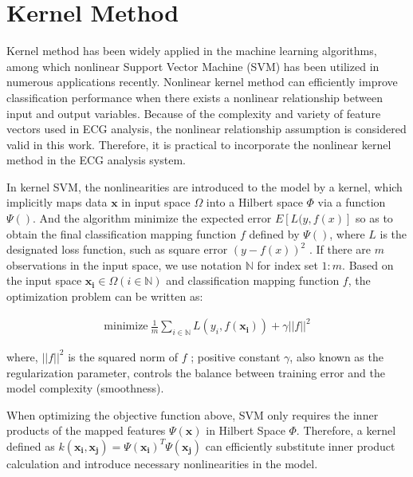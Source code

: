 \section{Kernel Method}

Kernel method has been widely applied in the machine learning algorithms, among which nonlinear Support Vector Machine (SVM) has been utilized in numerous applications recently\cite{shawe2004kernel}. Nonlinear kernel method can efficiently improve classification performance when there exists a nonlinear relationship between input and output variables. Because of the complexity and variety of feature vectors used in ECG analysis, the nonlinear relationship assumption is considered valid in this work. Therefore, it is practical to incorporate the nonlinear kernel method in the ECG analysis system.

In kernel SVM, the nonlinearities are introduced to the model by a kernel, which implicitly maps data $\mathbf{x}$ in input space $\Omega$ into a Hilbert space $\Phi$ via a function $\Psi()$\cite{aronszajn1950theory}. And the algorithm  minimize the expected error $E[L(y,f(x)]$ so as to obtain the final classification mapping function $f$ defined by $\Psi()$, where $L$ is the designated loss function, such as square error $(y-f(x))^2$ \cite{scholkopf1999advances}. If there are $m$ observations in the input space, we use notation $\mathbb{N}$ for index set ${1:m}$. Based on the input space $\mathbf{x_i}\in \Omega (i\in \mathbb{N})$ and classification mapping function $f$, the optimization problem can be written as:

\begin{align}
    \text{minimize}~\frac{1}{m}\sum_{i\in \mathbb{N}}L(y_i,f(\mathbf{x_i})) + \gamma||f||^2
    \label{eq:kernel}
\end{align}

where, $||f||^2$ is the squared norm of $f$%
; positive constant $\gamma$, also known as the regularization parameter, controls the balance between training error and the model complexity (smoothness).


When optimizing the objective function above, SVM only requires the inner products of the mapped features $\Psi(\mathbf{x})$ in Hilbert Space $\Phi$. Therefore, a kernel defined as $k(\mathbf{x_i},\mathbf{x_j}) = \Psi(\mathbf{x_i})^T\Psi(\mathbf{x_j})$ can efficiently substitute inner product calculation and introduce necessary nonlinearities in the model\cite{evgeniou2000regularization}.


